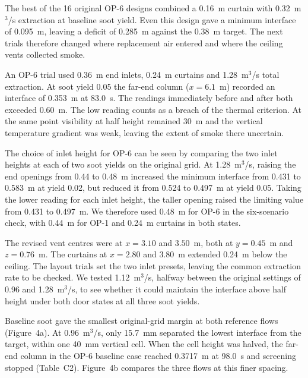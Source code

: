 The best of the 16 original OP-6 designs combined a 0.16~m curtain with 0.32~m$^3$/s extraction at baseline soot yield. Even this design gave a minimum interface of 0.095~m, leaving a deficit of 0.285~m against the 0.38~m target. The next trials therefore changed where replacement air entered and where the ceiling vents collected smoke.

An OP-6 trial used 0.36~m end inlets, 0.24~m curtains and 1.28~m$^3$/s total extraction. At soot yield 0.05 the far-end column ($x=6.1$~m) recorded an interface of 0.353~m at 83.0~s. The readings immediately before and after both exceeded 0.60~m. The low reading counts as a breach of the thermal criterion. At the same point visibility at half height remained 30~m and the vertical temperature gradient was weak, leaving the extent of smoke there uncertain.

The choice of inlet height for OP-6 can be seen by comparing the two inlet heights at each of two soot yields on the original grid. At 1.28~m$^3$/s, raising the end openings from 0.44 to 0.48~m increased the minimum interface from 0.431 to 0.583~m at yield 0.02, but reduced it from 0.524 to 0.497~m at yield 0.05. Taking the lower reading for each inlet height, the taller opening raised the limiting value from 0.431 to 0.497~m. We therefore used 0.48~m for OP-6 in the six-scenario check, with 0.44~m for OP-1 and 0.24~m curtains in both states.

\clearpage
{}
The revised vent centres were at $x=3.10$ and $3.50$~m, both at $y=0.45$~m and $z=0.76$~m. The curtains at $x=2.80$ and $3.80$~m extended 0.24~m below the ceiling. The layout trials set the two inlet presets, leaving the common extraction rate to be checked. We tested 1.12~m$^3$/s, halfway between the original settings of 0.96 and 1.28~m$^3$/s, to see whether it could maintain the interface above half height under both door states at all three soot yields.



Baseline soot gave the smallest original-grid margin at both reference flows (Figure~4a). At 0.96~m$^3$/s, only 15.7~mm separated the lowest interface from the target, within one 40~mm vertical cell. When the cell height was halved, the far-end column in the OP-6 baseline case reached 0.3717~m at 98.0~s and screening stopped (Table~C2). Figure~4b compares the three flows at this finer spacing.

